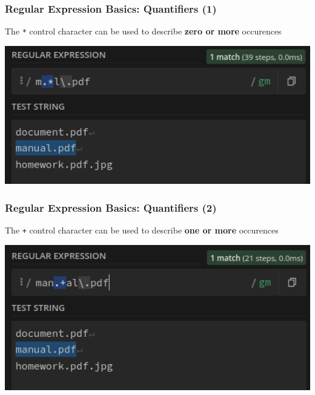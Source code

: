 \documentclass{beamer}
\begin{document}
\begin{frame}[fragile]
    \frametitle{Regular Expression Basics: Quantifiers (1)}
    \begin{center}
        The \texttt{*} control character can be used to describe \textbf{zero or more} occurences
    \end{center}
    \begin{center}
    \includegraphics[width=1.0\textwidth]{pics/regex/regex7.png}
    \end{center}
\end{frame}

\begin{frame}[fragile]
    \frametitle{Regular Expression Basics: Quantifiers (2)}
    \begin{center}
        The \texttt{+} control character can be used to describe \textbf{one or more} occurences
    \end{center}
    \begin{center}
    \includegraphics[width=1.0\textwidth]{pics/regex/regex9.png}
    \end{center}
\end{frame}
\end{document}
